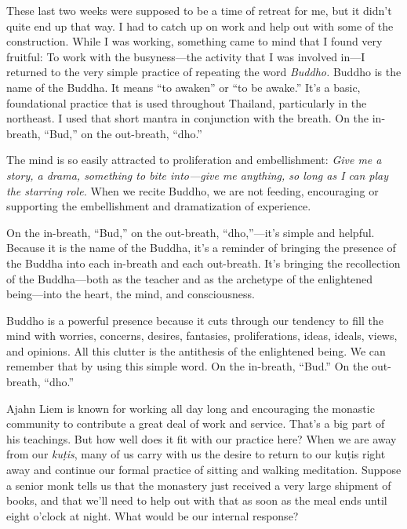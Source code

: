 
These last two weeks were supposed to be a time of retreat for me, but 
it didn't quite end up that way. I had to catch up on work and help out 
with some of the construction. While I was working, something came to 
mind that I found very fruitful: To work with the busyness---the 
activity that I was involved in---I returned to the very simple 
practice of repeating the word \emph{Buddho.} Buddho is the name of the 
Buddha. It means ``to awaken'' or ``to be awake.'' It's a basic, 
foundational practice that is used throughout Thailand, particularly in 
the northeast. I used that short mantra in conjunction with the breath. 
On the in-breath, ``Bud,'' on the out-breath, ``dho.''

The mind is so easily attracted to proliferation and embellishment: 
\emph{Give me a story, a drama, something to bite into---give me 
anything, so long as I can play the starring role.} When we recite 
Buddho, we are not feeding, encouraging or supporting the embellishment 
and dramatization of experience.

On the in-breath, ``Bud,'' on the out-breath, ``dho,''---it's simple 
and helpful. Because it is the name of the Buddha, it's a reminder of 
bringing the presence of the Buddha into each in-breath and each 
out-breath. It's bringing the recollection of the Buddha---both as the 
teacher and as the archetype of the enlightened being---into the heart, 
the mind, and consciousness.

Buddho is a powerful presence because it cuts through our tendency to 
fill the mind with worries, concerns, desires, fantasies, 
proliferations, ideas, ideals, views, and opinions. All this clutter is 
the antithesis of the enlightened being. We can remember that by using 
this simple word. On the in-breath, ``Bud.'' On the out-breath, ``dho.''


Ajahn Liem is known for working all day long and encouraging the 
monastic community to contribute a great deal of work and service. 
That's a big part of his teachings. But how well does it fit with our 
practice here? When we are away from our \emph{kuṭis}, many of us 
carry with us the desire to return to our kuṭis right away and 
continue our formal practice of sitting and walking meditation. Suppose 
a senior monk tells us that the monastery just received a very large 
shipment of books, and that we'll need to help out with that as soon as 
the meal ends until eight o'clock at night. What would be our internal 
response?

